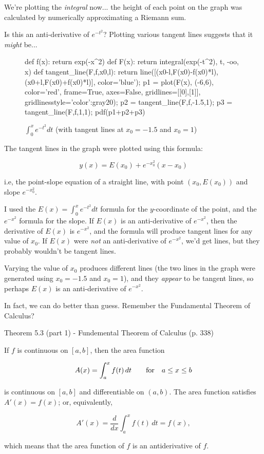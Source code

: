 We're plotting the {\it integral} now... the height of each point on the graph
was calculated by numerically approximating a Riemann sum.

Is this an anti-derivative of $e^{-t^2}$?  Plotting various tangent lines suggests
that it {\it might} be...

\begin{figure}[H]
\begin{center}
\begin{sagecode}
def f(x):
    return exp(-x^2)
def F(x):
    return integral(exp(-t^2), t, -oo, x)
def tangent_line(F,f,x0,l):
    return line([(x0-l,F(x0)-f(x0)*l), (x0+l,F(x0)+f(x0)*l)], color='blue');
p1 = plot(F(x), (-6,6), color='red', frame=True, axes=False, gridlines=[[0],[1]], gridlinesstyle={'color':gray20});
p2 = tangent_line(F,f,-1.5,1);
p3 = tangent_line(F,f,1,1);
pdf(p1+p2+p3)
\end{sagecode}
\end{center}
\caption{$\int_0^x e^{-t^2} dt$ (with tangent lines at $x_0=-1.5$ and $x_0=1$)}
\end{figure}

The tangent lines in the graph were plotted using this formula:

$$ y(x) = E(x_0) + e^{-x_0^2}(x-x_0)$$

i.e, the point-slope equation of a straight line, with point $(x_0, E(x_0))$ and slope $e^{-x_0^2}$.

I used the $E(x) = \int_0^x e^{-t^2} dt$ formula for the $y$-coordinate of the point,
and the $e^{-x^2}$ formula for the slope.
If $E(x)$ is an anti-derivative of $e^{-x^2}$, then the derivative of $E(x)$ is $e^{-x^2}$, and
the formula will produce tangent lines for any value of $x_0$.  If $E(x)$ were {\it not} an anti-derivative of $e^{-x^2}$,
we'd get lines, but they probably wouldn't be tangent lines.

Varying the value of $x_0$ produces different lines (the two lines in the graph were generated using $x_0 = -1.5$ and $x_0=1$),
and they {\it appear} to be tangent
lines, so perhaps $E(x)$ is an anti-derivative of $e^{-x^2}$.

In fact, we can do better than guess.  Remember the Fundamental Theorem of Calculus?


\begin{framed}
\cite{briggs} Theorem 5.3 (part 1) - Fundemental Theorem of Calculus (p. 338)

If $f$ is continuous on $[a,b]$, then the area function

$$A(x) = \int_a^x f(t)\, dt \qquad {\rm for\quad} a \le x \le b$$

is continuous on $[a,b]$ and differentiable on $(a,b)$.  The area function satisfies $A'(x) = f(x)$; or, equivalently,

$$A'(x) = \frac{d}{dx} \int_a^x f(t)\, dt = f(x),$$

which means that the area function of $f$ is an antiderivative of $f$.
\end{framed}

